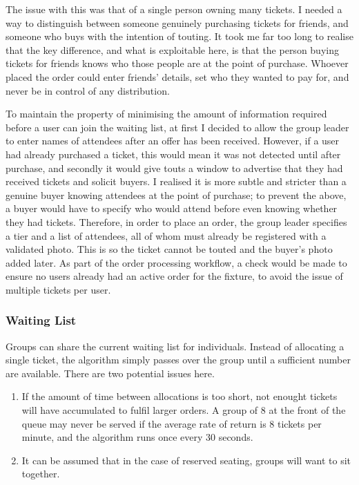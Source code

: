 \documentclass[12pt,a4]{bhamdissertation}
\begin{document}
The issue with this was that of a single person owning many tickets. I needed a way to distinguish between someone genuinely purchasing tickets for friends, and someone who buys with the intention of touting. It took me far too long to realise that the key difference, and what is exploitable here, is that the person buying tickets for friends knows who those people are at the point of purchase. Whoever placed the order could enter friends' details, set who they wanted to pay for, and never be in control of any distribution.

To maintain the property of minimising the amount of information required before a user can join the waiting list, at first I decided to allow the group leader to enter names of attendees after an offer has been received. However, if a user had already purchased a ticket, this would mean it was not detected until after purchase, and secondly it would give touts a window to advertise that they had received tickets and solicit buyers. I realised it is more subtle and stricter than a genuine buyer knowing attendees at the point of purchase; to prevent the above, a buyer would have to specify who would attend before even knowing whether they had tickets. Therefore, in order to place an order, the group leader specifies a tier and a list of attendees, all of whom must already be registered with a validated photo. This is so the ticket cannot be touted and the buyer's photo added later. As part of the order processing workflow, a check would be made to ensure no users already had an active order for the fixture, to avoid the issue of multiple tickets per user.

\subsubsection{Waiting List}

Groups can share the current waiting list for individuals. Instead of allocating a single ticket, the algorithm simply passes over the group until a sufficient number are available. There are two potential issues here.

\begin{enumerate}
    \item If the amount of time between allocations is too short, not enought tickets will have accumulated to fulfil larger orders. A group of 8 at the front of the queue may never be served if the average rate of return is 8 tickets per minute, and the algorithm runs once every 30 seconds.
    \item It can be assumed that in the case of reserved seating, groups will want to sit together.
\end{enumerate}
\end{document}
